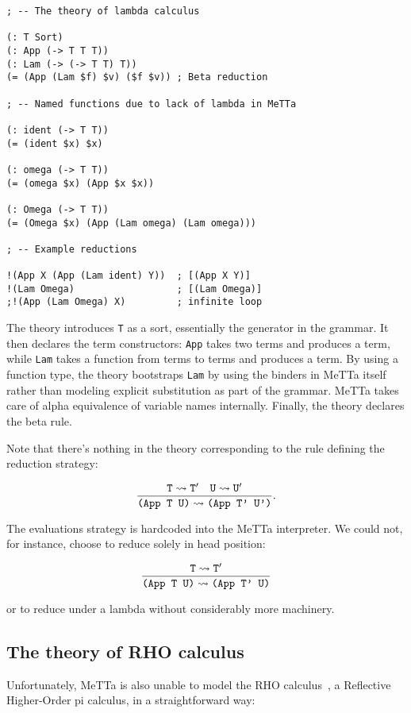 \documentclass{article}
\begin{document}
\begin{verbatim}
; -- The theory of lambda calculus

(: T Sort)
(: App (-> T T T))
(: Lam (-> (-> T T) T))
(= (App (Lam $f) $v) ($f $v)) ; Beta reduction

; -- Named functions due to lack of lambda in MeTTa

(: ident (-> T T))
(= (ident $x) $x)

(: omega (-> T T))
(= (omega $x) (App $x $x))

(: Omega (-> T T))
(= (Omega $x) (App (Lam omega) (Lam omega)))

; -- Example reductions

!(App X (App (Lam ident) Y))  ; [(App X Y)]
!(Lam Omega)                  ; [(Lam Omega)]
;!(App (Lam Omega) X)         ; infinite loop
\end{verbatim}

The theory introduces \verb+T+ as a sort, essentially the generator in the grammar.  It then declares the term constructors: \verb+App+ takes two terms and produces a term, while \verb+Lam+ takes a function from terms to terms and produces a term.  By using a function type, the theory bootstraps \verb+Lam+ by using the binders in MeTTa itself rather than modeling explicit substitution as part of the grammar.  MeTTa takes care of alpha equivalence of variable names internally.  Finally, the theory declares the beta rule.

Note that there's nothing in the theory corresponding to the rule defining the reduction strategy:

\[ \frac{{\tt T} \leadsto {\tt T'} \quad {\tt U} \leadsto {\tt U'}}{\mbox{\tt (App T U)} \leadsto \mbox{\tt (App T' U')}}. \]

The evaluations strategy is hardcoded into the MeTTa interpreter.  We could not, for instance, choose to reduce solely in head position:

\[ \frac{{\tt T} \leadsto {\tt T'}}{\mbox{\tt (App T U)} \leadsto \mbox{\tt (App T' U)}} \]

or to reduce under a lambda without considerably more machinery.

\subsection{The theory of RHO calculus}

Unfortunately, MeTTa is also unable to model the RHO calculus~\cite{MeredithRadestock2005}, a Reflective Higher-Order pi calculus, in a straightforward way:
\end{document}
